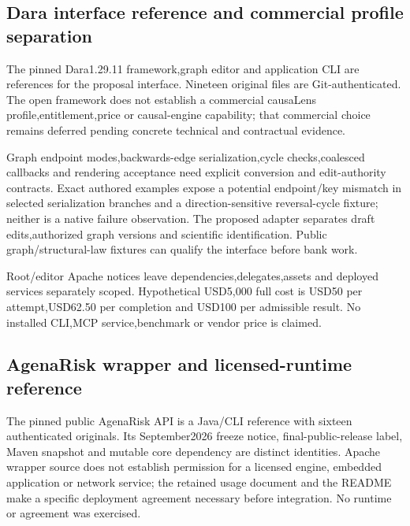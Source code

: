 \hypertarget{dara-interface-reference-and-commercial-profile-separation}{%
\subsection{Dara interface reference and commercial profile
separation}\label{dara-interface-reference-and-commercial-profile-separation}}

The pinned Dara1.29.11 framework,graph editor and application CLI are
references for the proposal interface. Nineteen original files are
Git-authenticated. The open framework does not establish a commercial
causaLens profile,entitlement,price or causal-engine capability; that
commercial choice remains deferred pending concrete technical and
contractual evidence.\citep{exec25_dara_source,exec25_dara_choice}

Graph endpoint modes,backwards-edge serialization,cycle checks,coalesced
callbacks and rendering acceptance need explicit conversion and
edit-authority contracts. Exact authored examples expose a potential
endpoint/key mismatch in selected serialization branches and a
direction-sensitive reversal-cycle fixture; neither is a native failure
observation. The proposed adapter separates draft edits,authorized graph
versions and scientific identification. Public graph/structural-law
fixtures can qualify the interface before bank
work.\citep{exec25_dara_source,exec25_dara_choice}

Root/editor Apache notices leave dependencies,delegates,assets and
deployed services separately scoped. Hypothetical USD5,000 full cost is
USD50 per attempt,USD62.50 per completion and USD100 per admissible
result. No installed CLI,MCP service,benchmark or vendor price is
claimed.\citep{exec25_dara_choice}

\hypertarget{agenarisk-wrapper-and-licensed-runtime-reference}{%
\subsection{AgenaRisk wrapper and licensed-runtime
reference}\label{agenarisk-wrapper-and-licensed-runtime-reference}}

The pinned public AgenaRisk API is a Java/CLI reference with sixteen
authenticated originals. Its September2026 freeze notice,
final-public-release label, Maven snapshot and mutable core dependency
are distinct identities. Apache wrapper source does not establish
permission for a licensed engine, embedded application or network
service; the retained usage document and the README make a specific
deployment agreement necessary before integration. No runtime or
agreement was exercised.\citep{exec25_agena_source,exec25_agena_choice}

